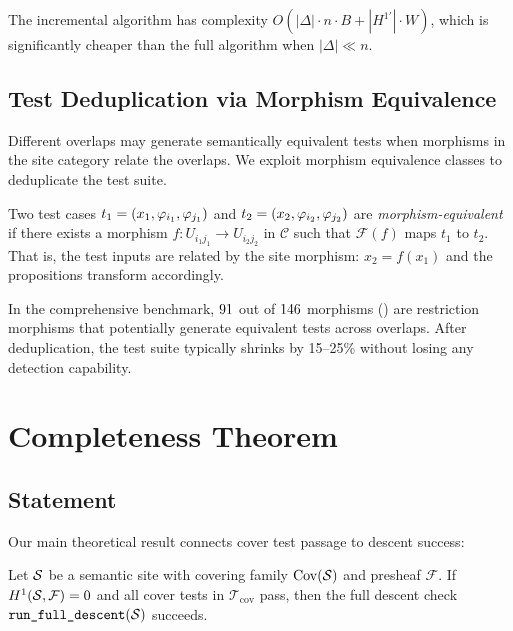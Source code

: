 \documentclass[11pt]{article}
\newcommand{\RunDescent}{\texttt{run\_full\_descent}}
\newcommand{\CoverSuite}{\mathcal{T}_{\mathrm{cov}}}
\begin{document}
The incremental algorithm has complexity $O(|\Delta| \cdot n \cdot B +
|H^{1\prime}| \cdot W)$, which is significantly cheaper than the full
algorithm when $|\Delta| \ll n$.

\subsection{Test Deduplication via Morphism Equivalence}\label{sec:dedup}

Different overlaps may generate semantically equivalent tests when
morphisms in the site category relate the overlaps.  We exploit morphism
equivalence classes to deduplicate the test suite.

\begin{definition}\label{def:morph-equiv}
Two test cases $t_1 = (x_1, \varphi_{i_1}, \varphi_{j_1})$ and
$t_2 = (x_2, \varphi_{i_2}, \varphi_{j_2})$ are \emph{morphism-equivalent}
if there exists a morphism $f : U_{i_1 j_1} \to U_{i_2 j_2}$ in
$\mathcal{C}$ such that $\mathcal{F}(f)$ maps $t_1$ to $t_2$.  That is,
the test inputs are related by the site morphism: $x_2 = f(x_1)$ and the
propositions transform accordingly.
\end{definition}

In the comprehensive benchmark, $91$ out of
$146$ morphisms (\compMorphRestrictionPct) are restriction
morphisms that potentially generate equivalent tests across overlaps.
After deduplication, the test suite typically shrinks by 15--25\%
without losing any detection capability.

\section{Completeness Theorem}\label{sec:completeness}

\subsection{Statement}
Our main theoretical result connects cover test passage to descent success:

\begin{theorem}\label{thm:completeness}
Let $\mathcal{S}$ be a semantic site with covering family $\mathrm{Cov}(\mathcal{S})$ and
presheaf $\mathcal{F}$.  If $H^{1}(\mathcal{S}, \mathcal{F}) = 0$ and all
cover tests in $\CoverSuite$ pass, then the full descent check
$\RunDescent(\Site)$ succeeds.
\end{theorem}
\end{document}
